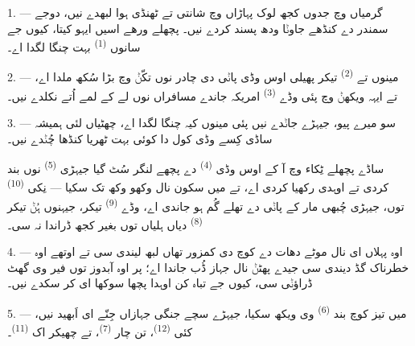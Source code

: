 %

\VUsaut{4.0mm}
\VUsaut{3.0mm}
\VUsaut{3.0mm}

1. --- گرمیاں وچ جدوں کجھ لوک پہاڑاں وچ شانتی تے ٹھنڈی ہوا لبھدے نیں، دوجے
سمندر دے کنڈھے جاوݨا ودھ پسند کردے نیں۔ پچھلے ورھے اسیں ایہو کیتا، کیوں جے سانوں
 \textsuperscript{(1)} بہت چنگا لگدا اے۔

2. --- مینوں تے  \textsuperscript{(2)} تیکر پھیلی اوس وڈی پاݨی دی چادر
نوں تکّݨ وچ بڑا سُکھ ملدا اے، تے ایہہ ویکھݨ وچ پئی وڈے 
\textsuperscript{(3)} امریکہ جاندے مسافراں نوں لے کے لمے  اُتے
نکلدے نیں۔

3. --- سو میرے پیو، جیہڑے جاݨدے نیں پئی مینوں کیہ چنگا لگدا اے، چھٹیاں لئی ہمیشہ
ساڈی کِسے وڈی  کول دا کوئی بہت ٹھریا کنڈھا چُݨدے نیں۔

ساڈے پچھلے ٹِکاء وچ  آ کے اوس وڈی 
\textsuperscript{(4)} دے پچھے لنگر سُٹ گیا جیہڑی 
\textsuperscript{(5)} نوں بند کردی تے اوہدی رکھیا کردی اے، تے میں سکون نال وکھو وکھ
 تک سکیا — نِکی  \textsuperscript{(10)} توں، جیہڑی
چُبھی مار کے پاݨی دے تھلے گُم ہو جاندی اے، وڈے 
\textsuperscript{(9)} تیکر، جیہنوں ہُݨ تیکر  \textsuperscript{(8)}
دیاں ہلیاں توں بغیر کجھ ڈراندا نہ سی۔

\VUsaut{3.0mm}
\VUsaut{3.0mm}

4. --- اوہ پہلاں ای  نال موٹے دھات دے کوچ دی کمزور تھاں لبھ
لیندی سی تے اوتھے اوہ خطرناک  گڈ دیندی سی جیدے پھٹݨ نال جہاز ڈُب
جاندا اے؛ پر اوہ آبدوز توں فیر وی گھٹ ڈراؤݨی سی، کیوں جے تباہ کن اوہدا پچھا سوکھا
ای کر سکدے نیں۔

5. --- میں تیز کوچ بند  \textsuperscript{(6)} وی ویکھ سکیا، جیہڑے سچے
جنگی جہازاں جِنّے ای اَبھید نیں، کئی  \textsuperscript{(12)}، تن
چار  \textsuperscript{(7)}، تے چھیکر اک 
\textsuperscript{(11)}۔

